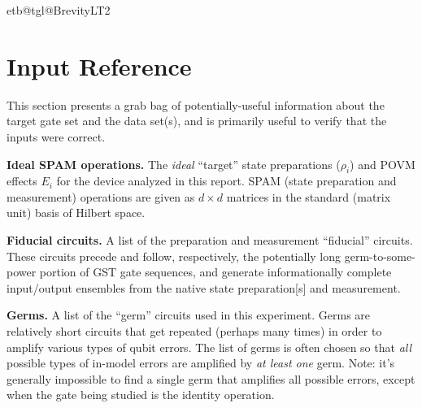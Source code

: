 \documentclass{article}[11pt]
\makeatletter
\newcommand{\iftoggleverb}[1]{%
  \ifcsdef{etb@tgl@#1}
    {\csname etb@tgl@#1\endcsname\iftrue\iffalse}
    {\etb@noglobal\etb@err@notoggle{#1}\iffalse}%
}
\newcommand{\putfield}[2]{#2}
\makeatother
\begin{document}
\iftoggleverb{BrevityLT2} %

\section{Input Reference}
This section presents a grab bag of potentially-useful information about the target gate set and the data set(s), and is primarily useful to verify that the inputs were correct.

\begin{table}[h]
  \begin{center}
    \begin{adjustbox}{max width=\textwidth}
      \putfield{target_spam_brief_table}{}
    \end{adjustbox}
    \caption{\textbf{Ideal SPAM operations.}  The \emph{ideal} ``target'' state preparations ($\rho_i$) and POVM effects $E_i$ for the device analyzed in this report.  SPAM (state preparation and measurement) operations are given as $d\times d$ matrices in the standard (matrix unit) basis of Hilbert space.}
  \end{center}
\end{table}

\begin{table}[h]
  \begin{center}
    \begin{adjustbox}{max width=\textwidth}
      \putfield{fiducial_list_table}{}
    \end{adjustbox}
    \caption{\textbf{Fiducial circuits.}  A list of the preparation and measurement ``fiducial'' circuits. These circuits precede and follow, respectively, the potentially long germ-to-some-power portion of GST gate sequences, and generate informationally complete input/output ensembles from the native state preparation[s] and measurement.}
  \end{center}
\end{table}

\begin{table}[h]
  \begin{center}
    \begin{adjustbox}{max width=\textwidth}
      \putfield{germ_list_2col_table}{}
    \end{adjustbox}
    \caption{\textbf{Germs.} A list of the ``germ'' circuits used in this experiment.  Germs are relatively short circuits that get repeated (perhaps many times) in order to amplify various types of qubit errors.  The list of germs is often chosen so that \emph{all} possible types of in-model errors are amplified by \emph{at least one} germ.  Note: it's generally impossible to find a single germ that amplifies all possible errors, except when the gate being studied is the identity operation.}
  \end{center}
\end{table}
\end{document}
